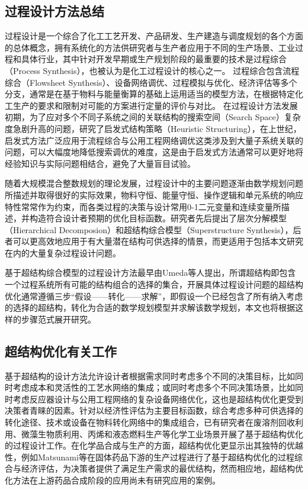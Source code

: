 \subsection{过程设计方法总结}
过程设计是一个综合了化工工艺开发、产品研发、生产建造与调度规划的各个方面的总体概念，拥有系统化的方法供研究者与生产者应用于不同的生产场景、工业过程和具体行业，其中针对开发早期或生产规划阶段的最重要的技术是过程综合（Process Synthesis），也被认为是化工过程设计的核心之一\cite{smith1995, barnicki2004}。
过程综合包含流程综合（Flowsheet Synthesis）、设备网络调优、过程模拟与优化、经济评估等多个分支，通常是在基于物料与能量衡算的基础上运用适当的模型方法，在根据特定化工生产的要求和限制对可能的方案进行定量的评价与对比\cite{osti_293030}。
在过程设计方法发展初期，为了应对多个不同子系统之间的关联结构的搜索空间（Search Space）复杂度急剧升高的问题，研究了启发式结构策略（Heuristic Structuring）\cite{masso1969}，在上世纪，启发式方法广泛应用于流程综合与公用工程网络调优这类涉及到大量子系统关联的问题\cite{papoulias1983,westerberg2004}，可以大幅度地降低搜索调优的难度，这是由于启发式方法通常可以更好地将经验知识与实际问题相结合，避免了大量盲目试验。

随着大规模混合整数规划的理论发展，过程设计中的主要问题逐渐由数学规划问题所描述并取得很好的实际效果，物料守恒、能量守恒、操作逻辑和单元系统的响应特性常常作为约束，而各类过程的决策与设计常用0-1二元变量和连续变量所描述，并构造符合设计者预期的优化目标函数。研究者先后提出了层次分解模型（Hierarchical Decomposion）和超结构综合模型（Superstructure Synthesis），后者可以更高效地应用于有大量潜在结构可供选择的情景，而更适用于包括本文研究在内的大量复杂过程设计问题\cite{westerberg2004, mencarelli2020,ryu2020}。

基于超结构综合模型的过程设计方法最早由Umeda等人提出，所谓超结构即包含一个过程系统所有可能的结构组合的选择的集合，开展具体过程设计问题的超结构优化通常遵循三步“假设——转化——求解”，即假设一个已经包含了所有纳入考虑的选择的超结构，转化为合适的数学规划模型并求解该数学规划\cite{umeda1972}，本文也将根据这样的步骤范式展开研究。


\subsection{超结构优化有关工作}

基于超结构的设计方法允许设计者根据需求同时考虑多个不同的决策目标，比如同时考虑成本和灵活性的工艺水网络的集成\cite{ahmetovic2011}；或同时考虑多个不同决策场景，比如同时考虑反应器设计与公用工程网络的复杂设备网络优化\cite{madenoor2018}，这也是超结构优化更受到决策者青睐的因素。针对以经济性评估为主要目标函数，综合考虑多种可供选择的转化途径、技术或设备在物料转化网络中的集成组合，已有研究者在废溶剂回收利用\cite{chea2020}、微藻生物质利用\cite{gong2017}、丙烯和液态燃料生产\cite{yuan2016}等化学工业场景开展了基于超结构优化的过程设计工作。在化学品合成与生产的方面，超结构优化更显示出其独特的优越性，例如Matsunami等在固体药品下游的生产过程进行了基于超结构优化的过程综合与经济评估，为决策者提供了满足生产需求的最优结构\cite{matsunami2020}，然而相应地，超结构优化方法在上游药品合成阶段的应用尚未有研究应用的案例。

